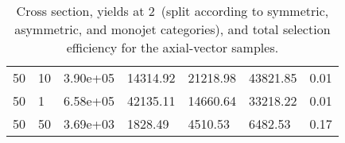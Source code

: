 \begin{table}
\begin{tabular}{lllllll}
50        &   10        &   3.90e+05  &   14314.92  &   21218.98  &   43821.85  &   0.01      \\ 
50        &   1         &   6.58e+05  &   42135.11  &   14660.64  &   33218.22  &   0.01      \\ 
50        &   50        &   3.69e+03  &   1828.49   &   4510.53   &   6482.53   &   0.17      \\ 
\hline
\end{tabular}
\caption{Cross section, yields at 2~\ifb (split according to symmetric, asymmetric, and monojet categories), and total selection efficiency for the axial-vector \DMj samples.}
\label{summaryTableAN_DMA_xs10_g1p0_2p1fb_exp}
\end{table}
